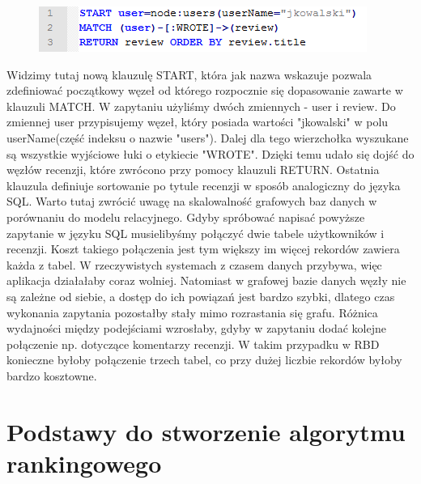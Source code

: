 \begin{figure}[H]
	\centering
	\includegraphics{images/cypher_q2.png}
\end{figure}

Widzimy tutaj nową klauzulę START, która jak nazwa wskazuje pozwala zdefiniować początkowy węzeł od którego rozpocznie się dopasowanie zawarte w klauzuli MATCH. W zapytaniu użyliśmy dwóch zmiennych - user i review. Do zmiennej user przypisujemy węzeł, który posiada wartości "jkowalski" w polu userName(część indeksu o nazwie "users"). Dalej dla tego wierzchołka wyszukane są wszystkie wyjściowe łuki o etykiecie "WROTE". Dzięki temu udało się dojść do węzłów recenzji, które zwrócono przy pomocy klauzuli RETURN. Ostatnia klauzula definiuje sortowanie po tytule recenzji w sposób analogiczny do języka SQL. Warto tutaj zwrócić uwagę na skalowalność grafowych baz danych w porównaniu do modelu relacyjnego. Gdyby spróbować napisać powyższe zapytanie w języku SQL musielibyśmy połączyć dwie tabele użytkowników i recenzji. Koszt takiego połączenia jest tym większy im więcej rekordów zawiera każda z tabel. W rzeczywistych systemach z czasem danych przybywa, więc aplikacja działałaby coraz wolniej. Natomiast w grafowej bazie danych węzły nie są zależne od siebie, a dostęp do ich powiązań jest bardzo szybki, dlatego czas wykonania zapytania pozostałby stały mimo rozrastania się grafu. Różnica wydajności między podejściami wzrosłaby, gdyby w zapytaniu dodać kolejne połączenie np. dotyczące komentarzy recenzji. W takim przypadku w RBD konieczne byłoby połączenie trzech tabel, co przy dużej liczbie rekordów byłoby bardzo kosztowne.


\section{Podstawy do stworzenie algorytmu rankingowego}
\label{sec:algTeotia}


